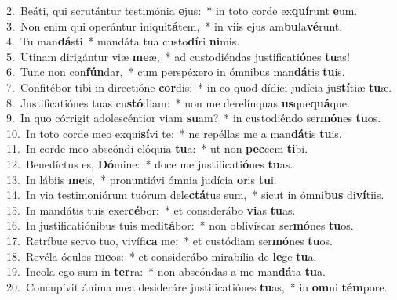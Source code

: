 {2.~}Beáti, qui scrutántur testimónia \textbf{e}jus:~* in toto corde ex\textbf{quí}runt \textbf{e}um.\\
{3.~}Non enim qui operántur iniqui\textbf{tá}tem,~* in viis ejus am\textbf{bu}la\textbf{vé}runt.\\
{4.~}Tu man\textbf{dá}sti~* mandáta tua custo\textbf{dí}ri \textbf{ni}mis.\\
{5.~}Utinam dirigántur viæ \textbf{me}æ,~* ad custodiéndas justificati\textbf{ó}nes \textbf{tu}as!\\
{6.~}Tunc non con\textbf{fún}dar,~* cum perspéxero in ómnibus man\textbf{dá}tis \textbf{tu}is.\\
{7.~}Confitébor tibi in directióne \textbf{cor}dis:~* in eo quod dídici judícia ju\textbf{stí}tiæ \textbf{tu}æ.\\
{8.~}Justificatiónes tuas cu\textbf{stó}diam:~* non me derelínquas \textbf{us}que\textbf{quá}que.\\
{9.~}In quo córrigit adolescéntior viam \textbf{su}am?~* in custodiéndo ser\textbf{mó}nes \textbf{tu}os.\\
{10.~}In toto corde meo exqui\textbf{sí}vi te:~* ne repéllas me a man\textbf{dá}tis \textbf{tu}is.\\
{11.~}In corde meo abscóndi elóquia \textbf{tu}a:~* ut non \textbf{pec}cem \textbf{ti}bi.\\
{12.~}Benedíctus es, \textbf{Dó}mine:~* doce me justificati\textbf{ó}nes \textbf{tu}as.\\
{13.~}In lábiis \textbf{me}is,~* pronuntiávi ómnia judícia \textbf{o}ris \textbf{tu}i.\\
{14.~}In via testimoniórum tuórum dele\textbf{ctá}tus sum,~* sicut in ómni\textbf{bus} di\textbf{ví}tiis.\\
{15.~}In mandátis tuis exer\textbf{cé}bor:~* et considerábo \textbf{vi}as \textbf{tu}as.\\
{16.~}In justificatiónibus tuis medi\textbf{tá}bor:~* non oblivíscar ser\textbf{mó}nes \textbf{tu}os.\\
{17.~}Retríbue servo tuo, vivífi\textbf{ca} me:~* et custódiam ser\textbf{mó}nes \textbf{tu}os.\\
{18.~}Revéla óculos \textbf{me}os:~* et considerábo mirabília de \textbf{le}ge \textbf{tu}a.\\
{19.~}Incola ego sum in \textbf{ter}ra:~* non abscóndas a me man\textbf{dá}ta \textbf{tu}a.\\
{20.~}Concupívit ánima mea desideráre justificatiónes \textbf{tu}as,~* in \textbf{om}ni \textbf{tém}pore.\\

